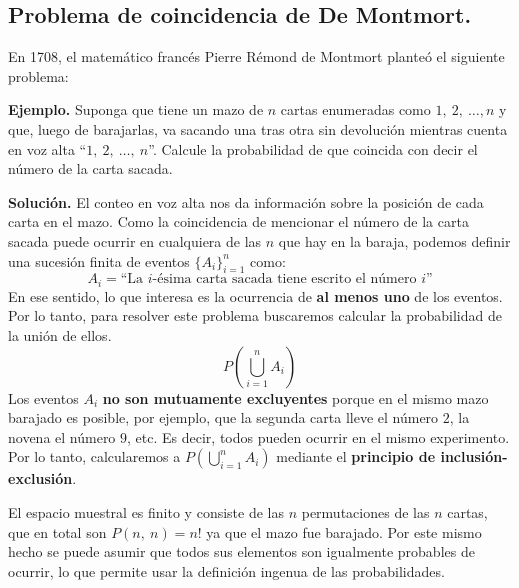 \documentclass[12pt]{article}
\begin{document}
\subsection{Problema de coincidencia de De Montmort.}

En 1708, el matemático francés Pierre Rémond de Montmort planteó el siguiente problema:

\textbf{Ejemplo.} Suponga que tiene un mazo de $n$ cartas enumeradas como $1, \ 2, \ \ldots, n$ y que, luego de barajarlas, va sacando una tras otra sin devolución mientras cuenta en voz alta ``$1, \ 2, \ \ldots, \ n$''. Calcule la probabilidad de que coincida con decir el número de la carta sacada.

\textbf{Solución.} El conteo en voz alta nos da información sobre la posición de cada carta en el mazo. Como la coincidencia de mencionar el número de la carta sacada puede ocurrir en cualquiera de las $n$ que hay en la baraja, podemos definir una sucesión finita de eventos $\{A_{i}\}_{i = 1}^{n}$ como:
\[
  A_{i} = \text{``La $i$-ésima carta sacada tiene escrito el número $i$''}
\]
En ese sentido, lo que interesa es la ocurrencia de \textbf{al menos uno} de los eventos. Por lo tanto, para resolver este problema buscaremos calcular la probabilidad de la unión de ellos.
\[
  P\left(\bigcup_{i = 1}^{n} A_{i}\right)
\]
Los eventos $A_{i}$ \textbf{no son mutuamente excluyentes} porque en el mismo mazo barajado es posible, por ejemplo, que la segunda carta lleve el número $2$, la novena el número $9$, etc. Es decir, todos pueden ocurrir en el mismo experimento. Por lo tanto, calcularemos a $P(\bigcup_{i = 1}^{n} A_{i})$ mediante el \textbf{principio de inclusión-exclusión}.

El espacio muestral es finito y consiste de las $n$ permutaciones de las $n$ cartas, que en total son $P(n, \ n) = n!$ ya que el mazo fue barajado. Por este mismo hecho se puede asumir que todos sus elementos son igualmente probables de ocurrir, lo que permite usar la definición ingenua de las probabilidades.
\end{document}
